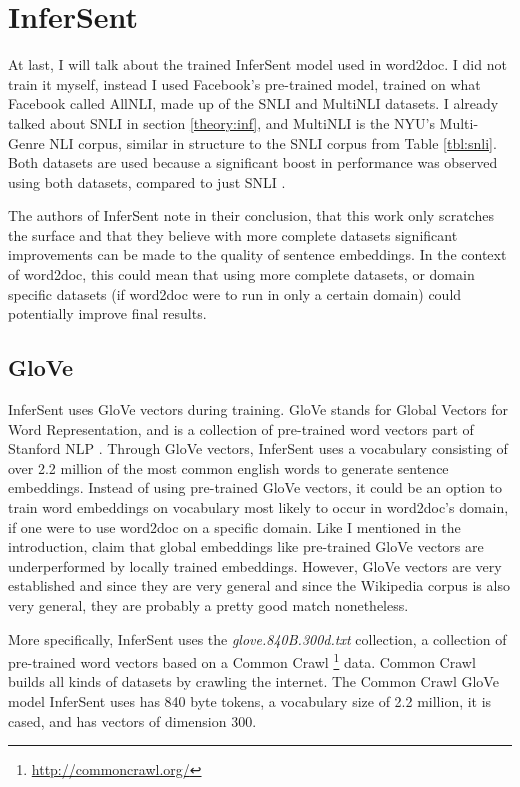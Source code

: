 \section{InferSent}

At last, I will talk about the trained InferSent model used in word2doc. I did not train it myself, instead I used
Facebook's pre-trained model, trained on what Facebook called AllNLI, made up of the SNLI and MultiNLI datasets. I already talked
about SNLI in section \ref{theory:inf}, and MultiNLI is the NYU's Multi-Genre NLI corpus, similar in structure to the SNLI corpus
from Table \ref{tbl:snli}. Both datasets are used because a significant boost in performance was observed using both datasets,
compared to just SNLI \citep{infersent}.

The authors of InferSent note in their conclusion, that this work only scratches the surface and that they believe with more
complete datasets significant improvements can be made to the quality of sentence embeddings. In the context of word2doc, this
could mean that using more complete datasets, or domain specific datasets (if word2doc were to run in only a certain domain)
could potentially improve final results.


\subsection{GloVe}

InferSent uses GloVe vectors during training. GloVe stands for Global Vectors for Word Representation, and is a collection of
pre-trained word vectors part of Stanford NLP \citep{glove}. Through GloVe vectors, InferSent uses a vocabulary consisting
of over 2.2 million of the most common english words to generate sentence embeddings. Instead of using pre-trained GloVe vectors,
it could be an option to train word embeddings on vocabulary most likely to occur in word2doc's domain, if one were
to use word2doc on a specific domain. Like I mentioned in the introduction, \citet{diaz2016} claim that global embeddings like
pre-trained GloVe vectors are underperformed by locally trained embeddings. However, GloVe vectors are very established and
since they are very general and since the Wikipedia corpus is also very general, they are probably a pretty good match nonetheless.

More specifically, InferSent uses the \textit{glove.840B.300d.txt} collection, a collection of pre-trained word vectors based on
a Common Crawl \footnote{\url{http://commoncrawl.org/}} data. Common Crawl builds all kinds of datasets by crawling the internet.
The Common Crawl GloVe model InferSent uses has 840 byte tokens, a vocabulary size of 2.2 million, it is cased, and has vectors
of dimension 300.

